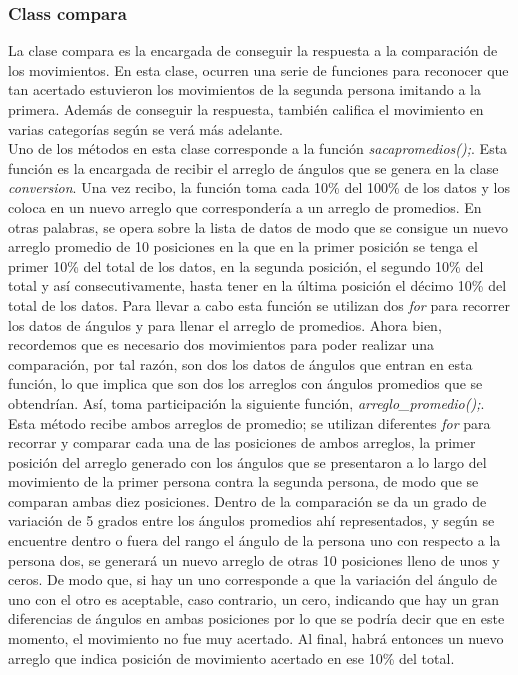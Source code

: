 \documentclass[letterpaper]{article}
\begin{document}
\subsubsection{Class compara}

\quad \quad La clase compara es la encargada de conseguir la respuesta a la comparación de los movimientos. En esta clase, ocurren una serie de funciones para reconocer que tan acertado estuvieron los movimientos de la segunda persona 
imitando a la primera. Además de conseguir la respuesta, también califica el movimiento en varias categorías según se verá más adelante.\\

Uno de los métodos en esta clase corresponde a la función \textit{sacapromedios();}. Esta función es la encargada de recibir el arreglo de ángulos que se genera en la clase \textit{conversion}. Una vez recibo, la función toma cada 10\% del 100\% de los datos y los coloca en un nuevo arreglo 
que correspondería a un arreglo de promedios. En otras palabras, se opera sobre la lista de datos de modo que se consigue un nuevo arreglo promedio de 10 posiciones en la que en la primer posición se tenga el primer 10\% del total de los datos, en la segunda posición, el segundo 10\% del total y así consecutivamente, hasta tener en la última posición el décimo 10\% del total de los datos.
Para llevar a cabo esta función se utilizan dos \textit{for} para recorrer los datos de ángulos y para llenar el arreglo de promedios. Ahora bien, recordemos que es necesario dos movimientos para poder realizar una comparación, por tal razón, son dos los datos de ángulos que entran en esta función, lo que implica que son dos los arreglos con ángulos promedios que se obtendrían. Así, toma participación
la siguiente función, \textit{arreglo_promedio();}. Esta método recibe ambos arreglos de promedio; se utilizan diferentes \textit{for} para recorrar y comparar cada una de las posiciones de ambos arreglos, la primer posición del arreglo generado con los ángulos que se presentaron a lo largo del movimiento de la primer persona contra la segunda persona, de modo que se comparan ambas diez posiciones. Dentro de la comparación
se da un grado de variación de 5 grados entre los ángulos promedios ahí representados, y según se encuentre dentro o fuera del rango el ángulo de la persona uno con respecto a la persona dos, se generará un nuevo arreglo de otras 10 posiciones lleno de unos y ceros. De modo que, si hay un uno corresponde a que la variación del ángulo de uno con el otro es aceptable, caso contrario, un cero, indicando que hay un gran diferencias de ángulos en ambas posiciones
por lo que se podría decir que en este momento, el movimiento no fue muy acertado. Al final, habrá entonces un nuevo arreglo que indica posición de movimiento acertado en ese 10\%  del total.\\
\end{document}
